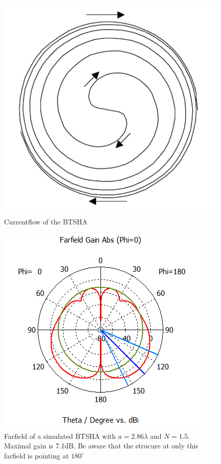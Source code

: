 \begin{figure}[H]
\centering 
\includegraphics[scale = 0.5]{figures/antennas/hemispherical/hemispherical_currentflow}
\caption{Currentflow of the BTSHA \citep{Clark2003}}
\label{fig:SHA2}
\end{figure} 


\begin{figure}[H]
\centering 
\includegraphics[scale = 0.7]{figures/antennas/hemispherical/hemispherical_farfield1}
\caption{Farfield of a simulated BTSHA with $a=2.86\lambda$ and $N=1.5$. Maximal gain is 7.1dB. Be aware that the strucure at only this farfield is pointing at $180^\circ$}
\label{fig:SHA_ff1}
\end{figure} 


